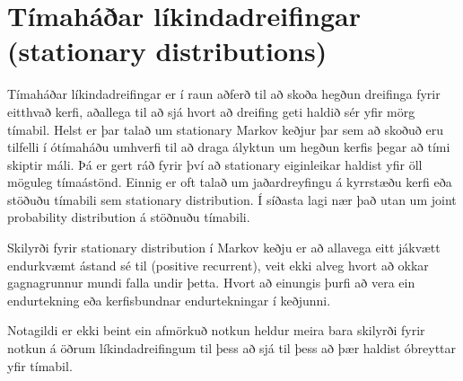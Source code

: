 \section {Tímaháðar líkindadreifingar (stationary distributions)}


Tímaháðar líkindadreifingar er í raun aðferð til að skoða hegðun dreifinga fyrir eitthvað kerfi, aðallega til að sjá hvort að dreifing geti haldið sér yfir mörg tímabil. Helst er þar talað um stationary Markov keðjur þar sem að skoðuð eru tilfelli í ótímaháðu umhverfi til að draga ályktun um hegðun kerfis þegar að tími skiptir máli. Þá er gert ráð fyrir því að stationary eiginleikar haldist yfir öll möguleg tímaástönd. Einnig er oft talað um jaðardreyfingu á kyrrstæðu kerfi eða stöðuðu tímabili sem stationary distribution. Í síðasta lagi nær það utan um joint probability distribution á stöðnuðu tímabili.

Skilyrði fyrir stationary distribution í Markov keðju er að allavega eitt jákvætt endurkvæmt ástand sé til (positive recurrent), veit ekki alveg hvort að okkar gagnagrunnur mundi falla undir þetta. Hvort að einungis þurfi að vera ein endurtekning eða kerfisbundnar endurtekningar í keðjunni.

Notagildi er ekki beint ein afmörkuð notkun heldur meira bara skilyrði fyrir notkun á öðrum líkindadreifingum til þess að sjá til þess að þær haldist óbreyttar yfir tímabil.
